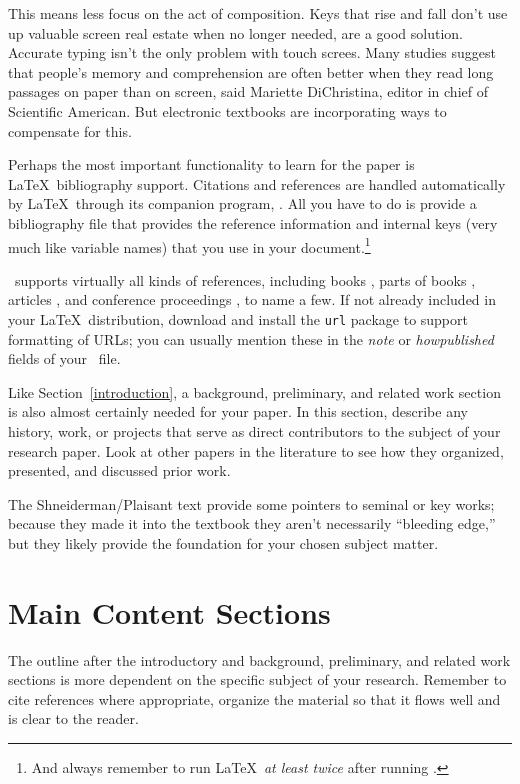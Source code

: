 \documentclass{article}
\begin{document}
This means less focus on the act of composition. Keys that rise and fall don't use up valuable screen real estate when no longer needed, are a good solution. Accurate typing isn't the only problem with touch screes. Many studies suggest that people's memory and comprehension are often better when they read long passages on paper than on screen, said Mariette DiChristina, editor in chief of Scientific American. But electronic textbooks are incorporating ways to compensate for this.

Perhaps the most important functionality to learn for the paper is \LaTeX\ bibliography support.  Citations and references are handled automatically by \LaTeX\ through its companion program, \BibTeX.  All you have to do is provide a bibliography file that provides the reference information and internal keys (very much like variable names) that you use in your document.\footnote{And always remember to run \LaTeX\ \emph{at least twice} after running \BibTeX.}

\BibTeX\ supports virtually all kinds of references, including books \cite{dui,sgg,iokit,palmos}, parts of books \cite{userModeLinux}, articles \cite{nielsen:dui-review,heer-shneiderman,stackableThreads,xpkernel}, and conference proceedings \cite{ux-3d,iring,contextFileSearch,osHaskell,hibernator}, to name a few.  If not already included in your \LaTeX\ distribution, download and install the \texttt{url} package to support formatting of URLs; you can usually mention these in the \emph{note} or \emph{howpublished} fields of your \BibTeX\ file.

Like Section~\ref{introduction}, a background, preliminary, and related work section is also almost certainly needed for your paper.  In this section, describe any history, work, or projects that serve as direct contributors to the subject of your research paper.  Look at other papers in the literature to see how they organized, presented, and discussed prior work.

The Shneiderman/Plaisant text \cite{dui} provide some pointers to seminal or key works; because they made it into the textbook they aren't necessarily ``bleeding edge,'' but they likely provide the foundation for your chosen subject matter.

\section{Main Content Sections}

The outline after the introductory and background, preliminary, and related work sections is more dependent on the specific subject of your research.  Remember to cite references where appropriate, organize the material so that it flows well and is clear to the reader.
\end{document}
